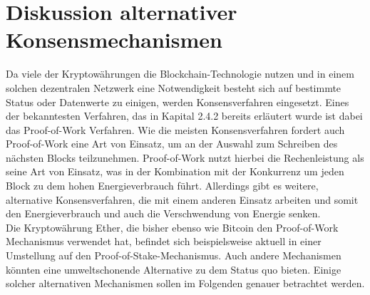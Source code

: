 \documentclass[12pt]{article}
\begin{document}
\section{Diskussion alternativer Konsensmechanismen}
Da viele der Kryptowährungen die Blockchain-Technologie nutzen und in einem solchen dezentralen Netzwerk eine Notwendigkeit besteht sich auf bestimmte Status oder Datenwerte zu einigen, werden Konsensverfahren eingesetzt. Eines der bekanntesten Verfahren, das in Kapital 2.4.2 bereits erläutert wurde ist dabei das Proof-of-Work Verfahren. Wie die meisten Konsensverfahren fordert auch Proof-of-Work eine Art von Einsatz, um an der Auswahl zum Schreiben des nächsten Blocks teilzunehmen. Proof-of-Work nutzt hierbei die Rechenleistung als seine Art von Einsatz, was in der Kombination mit der Konkurrenz um jeden Block zu dem hohen Energieverbrauch führt. Allerdings gibt es weitere, alternative Konsensverfahren, die mit einem anderen Einsatz arbeiten und somit den Energieverbrauch und auch die Verschwendung von Energie senken.\\
Die Kryptowährung Ether, die bisher ebenso wie Bitcoin den Proof-of-Work Mechanismus verwendet hat, befindet sich beispielsweise aktuell in einer Umstellung auf den Proof-of-Stake-Mechanismus. Auch andere Mechanismen könnten eine umweltschonende Alternative zu dem Status quo bieten. Einige solcher alternativen Mechanismen sollen im Folgenden genauer betrachtet werden.
\end{document}
